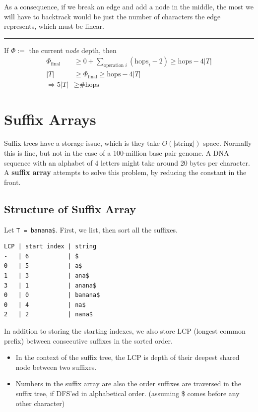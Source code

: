 \documentclass[10pt]{article}
\begin{document}
As a consequence, if we break an edge and add a node in the middle, the most we will have to backtrack would be just the number of characters the edge represents, which must be linear.\\
\rule{\textwidth}{1pt}
If $\Phi :=$ the current \textit{node} depth, then
\begin{align*}
    \Phi_{\text{final}} &\geq 0 + \sum_{\text{operation }i} (\text{hops}_i - 2) \geq \text{hops} - 4|T| \\
    |T| &\geq \Phi_{\text{final}} \geq \text{hops} - 4|T| \\
    \Rightarrow 5|T| &\geq \text{\#hops}
\end{align*}

\section*{Suffix Arrays}
Suffix trees have a storage issue, which is they take $O(|\text{string}|)$ space.  Normally this is fine, but not in the case of a 100-million base pair genome.  A DNA sequence with an alphabet of 4 letters might take around 20 bytes per character.  A \textbf{suffix array} attempts to solve this problem, by reducing the constant in the front.

\subsection*{Structure of Suffix Array}
Let \texttt{T = banana\$}.  First, we list, then sort all the suffixes.
\begin{verbatim}
LCP | start index | string
-   | 6           | $
0   | 5           | a$
1   | 3           | ana$
3   | 1           | anana$
0   | 0           | banana$
0   | 4           | na$
2   | 2           | nana$
\end{verbatim}
In addition to storing the starting indexes, we also store LCP (longest common prefix) between consecutive suffixes in the sorted order.
\begin{itemize}
	\item In the context of the suffix tree, the LCP is depth of their deepest shared node between two suffixes.
	\item Numbers in the suffix array are also the order suffixes are traversed in the suffix tree, if DFS'ed in alphabetical order. (assuming \$ comes before any other character)
\end{itemize}
\end{document}
